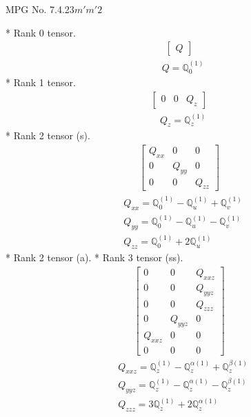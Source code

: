 \documentclass[fleqn,8pt,landscape]{jsarticle}
\begin{document}
\setcounter{MaxMatrixCols}{32}

\renewcommand{\tablename}{Table~}
\renewcommand{\figurename}{Figure~}
\begin{center}
\LARGE
MPG No. 7.4.23\quad$m'm'2$
\end{center}
* Rank 0 tensor.
\begin{align*}
\begin{bmatrix} Q \end{bmatrix}
\end{align*}
\begin{align*}
& Q = \mathbb{Q}_{0}^{(1)}
\end{align*}
* Rank 1 tensor.
\begin{align*}
\begin{bmatrix} 0 & 0 & Q_{z} \end{bmatrix}
\end{align*}
\begin{align*}
& Q_{z} = \mathbb{Q}_{z}^{(1)}
\end{align*}
* Rank 2 tensor (s).
\begin{align*}
\begin{bmatrix} Q_{xx} & 0 & 0 \\ 0 & Q_{yy} & 0 \\ 0 & 0 & Q_{zz} \end{bmatrix}
\end{align*}
\begin{align*}
& Q_{xx} = \mathbb{Q}_{0}^{(1)} - \mathbb{Q}_{u}^{(1)} + \mathbb{Q}_{v}^{(1)} \\
& Q_{yy} = \mathbb{Q}_{0}^{(1)} - \mathbb{Q}_{u}^{(1)} - \mathbb{Q}_{v}^{(1)} \\
& Q_{zz} = \mathbb{Q}_{0}^{(1)} + 2 \mathbb{Q}_{u}^{(1)}
\end{align*}
* Rank 2 tensor (a).
* Rank 3 tensor (ss).
\begin{align*}
\begin{bmatrix} 0 & 0 & Q_{xxz} \\ 0 & 0 & Q_{yyz} \\ 0 & 0 & Q_{zzz} \\ 0 & Q_{yyz} & 0 \\ Q_{xxz} & 0 & 0 \\ 0 & 0 & 0 \end{bmatrix}
\end{align*}
\begin{align*}
& Q_{xxz} = \mathbb{Q}_{z}^{(1)} - \mathbb{Q}_{z}^{\alpha(1)} + \mathbb{Q}_{z}^{\beta(1)} \\
& Q_{yyz} = \mathbb{Q}_{z}^{(1)} - \mathbb{Q}_{z}^{\alpha(1)} - \mathbb{Q}_{z}^{\beta(1)} \\
& Q_{zzz} = 3 \mathbb{Q}_{z}^{(1)} + 2 \mathbb{Q}_{z}^{\alpha(1)}
\end{align*}
\end{document}
